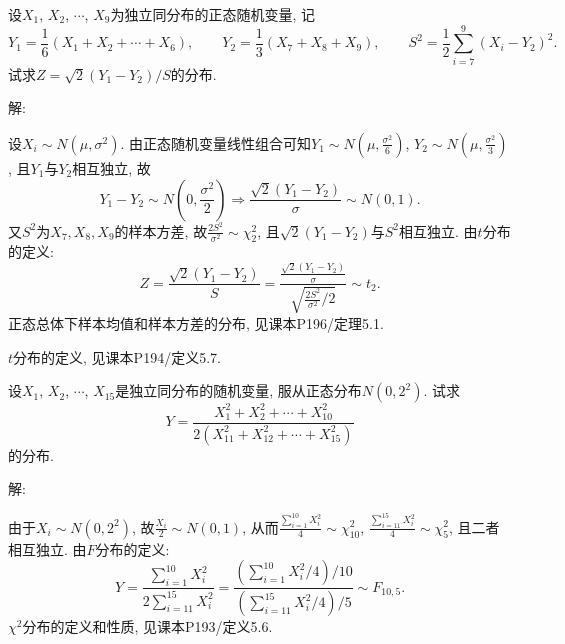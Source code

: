 \documentclass[standard]{ExBook}
\renewenvironment{shaded}{%
  \def\FrameCommand{\fboxsep=\FrameSep \colorbox{shadecolor}}%
  \MakeFramed{\advance\hsize-\width \FrameRestore}%
}{%
  \endMakeFramed
}
\begin{document}
\begin{qitems}
\vspace{2.5cm-5em}

    \begin{bbox}
    \begin{shaded}
        \qitem
设$X_1$, $X_2$, $\cdots$, $X_9$为独立同分布的正态随机变量, 记
$$Y_1 = \displaystyle\frac{1}{6}(X_1+X_2+\cdots+X_6), \qquad Y_2 = \frac{1}{3}(X_7+X_8+X_9), \qquad S^2=\frac{1}{2}\sum\limits_{i=7}^{9}(X_i-Y_2)^2.$$
试求$Z=\sqrt{2}(Y_1-Y_2) \big/ S$的分布.
    \end{shaded}
    \end{bbox}

\vspace{\dimexpr2.5cm-5em\relax}

解:

设$X_i\sim N(\mu,\sigma^2)$. 由正态随机变量线性组合可知$Y_1\sim N(\mu,\frac{\sigma^2}{6})$, $Y_2\sim N(\mu,\frac{\sigma^2}{3})$, 且$Y_1$与$Y_2$相互独立, 故
$$
Y_1-Y_2\sim N\left(0,\frac{\sigma^2}{2}\right)
\Longrightarrow
\frac{\sqrt{2}(Y_1-Y_2)}{\sigma}\sim N(0,1).
$$
又$S^2$为$X_7,X_8,X_9$的样本方差, 故$\displaystyle\frac{2S^2}{\sigma^2}\sim\chi_2^2$, 且$\sqrt{2}(Y_1-Y_2)$与$S^2$相互独立. 由$t$分布的定义:
$$
Z=\frac{\sqrt{2}(Y_1-Y_2)}{S}
=
\frac{\frac{\sqrt{2}(Y_1-Y_2)}{\sigma}}
{\sqrt{\frac{2S^2}{\sigma^2}/2}}
\sim t_2.
$$
\textcolor{themeColor}{\selectfont {} 正态总体下样本均值和样本方差的分布, 见课本P196/定理5.1.}

\textcolor{themeColor}{\selectfont {} $t$分布的定义, 见课本P194/定义5.7.}

\vspace{2.5cm-5em}

    \begin{bbox}
    \begin{shaded}
        \qitem
设$X_1$, $X_2$, $\cdots$, $X_{15}$是独立同分布的随机变量, 服从正态分布$N(0,2^2)$. 试求
$$Y = \displaystyle\frac{X_1^2+X_2^2+\cdots+X_{10}^2}{2\left(X_{11}^2+X_{12}^2+\cdots+X_{15}^2\right)}$$
的分布.
    \end{shaded}
    \end{bbox}

\vspace{\dimexpr2.5cm-5em\relax}

解:

由于$X_i\sim N(0,2^2)$, 故$\frac{X_i}{2}\sim N(0,1)$, 从而$\frac{\sum\limits_{i=1}^{10}X_i^2}{4}\sim\chi_{10}^2$, $\frac{\sum\limits_{i=11}^{15}X_i^2}{4}\sim\chi_{5}^2$, 且二者相互独立. 由$F$分布的定义:
$$
Y=\frac{\sum\limits_{i=1}^{10}X_i^2}{2\sum\limits_{i=11}^{15}X_i^2}
=
\frac{\left(\sum\limits_{i=1}^{10}X_i^2/4\right)/10}{\left(\sum\limits_{i=11}^{15}X_i^2/4\right)/5}
\sim F_{10,5}.
$$
\textcolor{themeColor}{\selectfont {} $\chi^2$分布的定义和性质, 见课本P193/定义5.6.}


\end{qitems}
\end{document}
